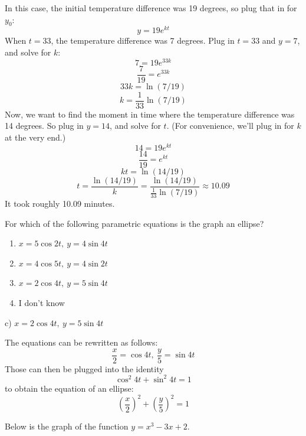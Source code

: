 \documentclass[addpoints,12pt,answers]{exam}
\begin{document}
\begin{questions}
\begin{solution}
    In this case, the initial temperature difference was 19 degrees, so plug that in for $y_0$:
    $$y=19e^{kt}$$
    When $t=33$, the temperature difference was 7 degrees. Plug in $t=33$ and $y=7$, and solve for $k$:
    $$7=19e^{33k}$$
    $$\frac{7}{19}=e^{33k}$$
    $$33k=\ln(7/19)$$
    $$k=\frac{1}{33}\ln(7/19)$$
    Now, we want to find the moment in time where the temperature difference was 14 degrees. So plug in $y=14$, and solve for $t$. (For convenience, we'll plug in for $k$ at the very end.)
    $$14=19e^{kt}$$
    $$\frac{14}{19}=e^{kt}$$
    $$kt=\ln(14/19)$$
    $$t=\frac{\ln(14/19)}{k}=\frac{\ln(14/19)}{\frac{1}{33}\ln(7/19)}\approx 10.09$$
    It took roughly 10.09 minutes.
  \end{solution}
  \newpage
{}
  \question
  For which of the following parametric equations is the graph an ellipse?
  \begin{enumerate}[label=\alph*)]
    \item
    $x=5\cos 2t, \ y=4\sin 4t$
    \item
    $x=4\cos 5t, \ y=4\sin 2t$
    \item
    $x=2\cos 4t, \ y=5\sin 4t$
    \item
    I don't know
  \end{enumerate}
  \begin{solution}
    c) $x=2\cos 4t, \ y=5\sin 4t$
    
    The equations can be rewritten as follows:
    $$\frac{x}{2}=\cos 4t, \ \frac{y}{5}=\sin 4t$$
    Those can then be plugged into the identity
    $$\cos^2 4t+\sin^2 4t=1$$
    to obtain the equation of an ellipse:
    $$\left(\frac{x}{2}\right)^2+\left(\frac{y}{5}\right)^2=1$$
  \end{solution}
  \newpage
  \question
  Below is the graph of the function $y=x^3-3x+2$.
  \begin{center}
\end{center}
\end{questions}
\end{document}
